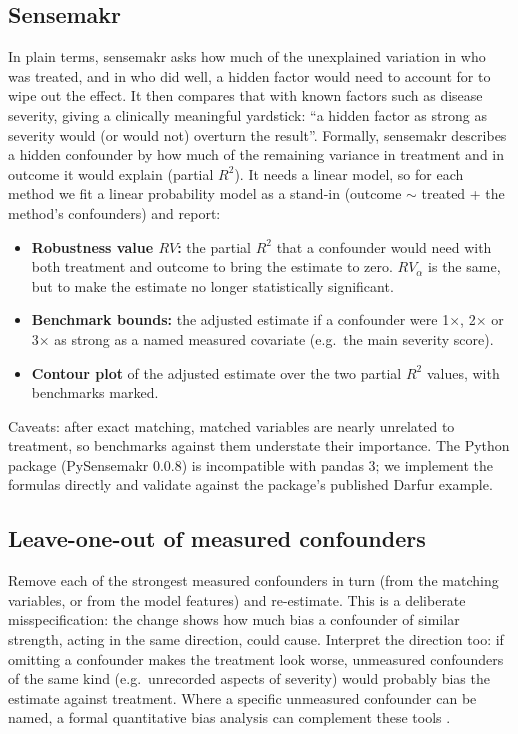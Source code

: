\subsection{Sensemakr}

In plain terms, sensemakr asks how much of the unexplained variation in who was treated, and in who did well, a hidden factor would need to account for to wipe out the effect. It then compares that with known factors such as disease severity, giving a clinically meaningful yardstick: ``a hidden factor as strong as severity would (or would not) overturn the result''. Formally, sensemakr \cite{cinelli2020} describes a hidden confounder by how much of the remaining variance in treatment and in outcome it would explain (partial $R^2$). It needs a linear model, so for each method we fit a linear probability model as a stand-in (outcome $\sim$ treated + the method's confounders) and report:
\begin{itemize}
\item \textbf{Robustness value $RV$:} the partial $R^2$ that a confounder would need with both treatment and outcome to bring the estimate to zero. \textbf{$RV_\alpha$} is the same, but to make the estimate no longer statistically significant.
\item \textbf{Benchmark bounds:} the adjusted estimate if a confounder were 1$\times$, 2$\times$ or 3$\times$ as strong as a named measured covariate (e.g.\ the main severity score).
\item \textbf{Contour plot} of the adjusted estimate over the two partial $R^2$ values, with benchmarks marked.
\end{itemize}
Caveats: after exact matching, matched variables are nearly unrelated to treatment, so benchmarks against them understate their importance. The Python package (PySensemakr 0.0.8) is incompatible with pandas 3; we implement the formulas directly and validate against the package's published Darfur example.

\subsection{Leave-one-out of measured confounders}

Remove each of the strongest measured confounders in turn (from the matching variables, or from the model features) and re-estimate. This is a deliberate misspecification: the change shows how much bias a confounder of similar strength, acting in the same direction, could cause. Interpret the direction too: if omitting a confounder makes the treatment look worse, unmeasured confounders of the same kind (e.g.\ unrecorded aspects of severity) would probably bias the estimate against treatment. Where a specific unmeasured confounder can be named, a formal quantitative bias analysis can complement these tools \cite{lash2014}.

